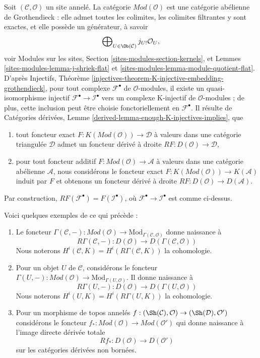 \noindent
Soit $(\mathcal{C}, \mathcal{O})$ un site annelé. La catégorie
$\textit{Mod}(\mathcal{O})$ est une catégorie abélienne de Grothendieck :
elle admet toutes les colimites, les colimites filtrantes y sont exactes,
et elle possède un générateur, à savoir
$$
\bigoplus\nolimits_{U \in \Ob(\mathcal{C})} j_{U!}\mathcal{O}_U,
$$
voir Modules sur les sites, Section \ref{sites-modules-section-kernels}, et
Lemmes \ref{sites-modules-lemma-j-shriek-flat} et
\ref{sites-modules-lemma-module-quotient-flat}. D'après Injectifs, Théorème
\ref{injectives-theorem-K-injective-embedding-grothendieck}, pour tout
complexe $\mathcal{F}^\bullet$ de $\mathcal{O}$-modules, il existe un
quasi-isomorphisme injectif
$\mathcal{F}^\bullet \to \mathcal{I}^\bullet$ vers un complexe K-injectif
de $\mathcal{O}$-modules ; de plus, cette inclusion peut être choisie
fonctoriellement en $\mathcal{F}^\bullet$. Il résulte de Catégories
dérivées, Lemme \ref{derived-lemma-enough-K-injectives-implies}, que
\begin{enumerate}
\item tout foncteur exact $F : K(\textit{Mod}(\mathcal{O})) \to \mathcal{D}$
à valeurs dans une catégorie triangulée $\mathcal{D}$ admet un foncteur
dérivé à droite
$RF : D(\mathcal{O}) \to \mathcal{D}$,
\item pour tout foncteur additif
$F : \textit{Mod}(\mathcal{O}) \to \mathcal{A}$
à valeurs dans une catégorie abélienne $\mathcal{A}$, nous considérons le
foncteur exact $F : K(\textit{Mod}(\mathcal{O})) \to K(\mathcal{A})$
induit par $F$ et obtenons un foncteur dérivé à droite
$RF : D(\mathcal{O}) \to D(\mathcal{A})$.
\end{enumerate}
Par construction, $RF(\mathcal{F}^\bullet) = F(\mathcal{I}^\bullet)$, où
$\mathcal{F}^\bullet \to \mathcal{I}^\bullet$ est comme ci-dessus.

\medskip\noindent
Voici quelques exemples de ce qui précède :
\begin{enumerate}
\item Le foncteur $\Gamma(\mathcal{C}, -) : \textit{Mod}(\mathcal{O}) \to
\text{Mod}_{\Gamma(\mathcal{C}, \mathcal{O})}$ donne naissance à
$$
R\Gamma(\mathcal{C}, -) :
D(\mathcal{O})
\longrightarrow
D(\Gamma(\mathcal{C}, \mathcal{O}))
$$
Nous noterons
$H^i(\mathcal{C}, K) = H^i(R\Gamma(\mathcal{C}, K))$ la cohomologie.
\item Pour un objet $U$ de $\mathcal{C}$, considérons le foncteur
$\Gamma(U, -) : \textit{Mod}(\mathcal{O}) \to
\text{Mod}_{\Gamma(U, \mathcal{O})}$. Il donne naissance à
$$
R\Gamma(U, -) : D(\mathcal{O}) \to D(\Gamma(U, \mathcal{O}))
$$
Nous noterons $H^i(U, K) = H^i(R\Gamma(U, K))$ la cohomologie.
\item Pour un morphisme de topos annelés
$f : (\Sh(\mathcal{C}), \mathcal{O}) \to (\Sh(\mathcal{D}), \mathcal{O}')$
considérons le foncteur
$f_* : \textit{Mod}(\mathcal{O}) \to \textit{Mod}(\mathcal{O}')$
qui donne naissance à l'image directe dérivée totale
$$
Rf_* : D(\mathcal{O}) \longrightarrow D(\mathcal{O}')
$$
sur les catégories dérivées non bornées.
\end{enumerate}

